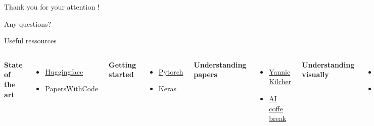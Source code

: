 \documentclass{irdbeamer}
\begin{document}
\begin{frame}[plain]
    \Huge{Thank you for your attention !}
    
    \vfill
    
    \LARGE{Any questions?}
\end{frame}


\appendix

\begin{frame}{Useful ressources}
\begin{columns}[t]
    \textbf{State of the art}
    \begin{itemize}
        \item \href{https://huggingface.co/}{Huggingface}
        \item \href{https://paperswithcode.com/sota}{PapersWithCode}
    \end{itemize}
    \textbf{Getting started}
    \begin{itemize}
        \item \href{https://docs.pytorch.org/tutorials/}{Pytorch}
        \item \href{https://keras.io/getting_started/}{Keras}
    \end{itemize}
    \textbf{Understanding papers}
    \begin{itemize}
        \item \href{https://www.youtube.com/@YannicKilcher}{Yannic Kilcher}
        \item \href{https://www.youtube.com/@AICoffeeBreak}{AI coffe break}
    \end{itemize}
    \textbf{Understanding visually}
    \begin{itemize}
        \item \href{https://www.youtube.com/@3blue1brown}{3blue1brown}
        \item \href{https://www.youtube.com/@Deepia-ls2fo}{deepia}
    \end{itemize}
\end{columns}

\end{frame}

    
\end{document}
